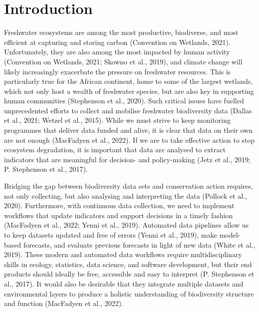 \documentclass[utf8]{frontiersSCNS}
\begin{document}
\hypertarget{introduction}{%
\section*{Introduction}\label{introduction}}

Freshwater ecosystems are among the most productive, biodiverse, and
most efficient at capturing and storing carbon (Convention on Wetlands,
2021). Unfortunately, they are also among the most impacted by human
activity (Convention on Wetlands, 2021; Skowno et al., 2019), and
climate change will likely increasingly exacerbate the pressure on
freshwater resources. This is particularly true for the African
continent, home to some of the largest wetlands, which not only host a
wealth of freshwater species, but are also key in supporting human
communities (Stephenson et al., 2020). Such critical issues have fuelled
unprecedented efforts to collect and mobilise freshwater biodiversity
data (Dallas et al., 2021; Wetzel et al., 2015). While we must strive to
keep monitoring programmes that deliver data funded and alive, it is
clear that data on their own are not enough (MacFadyen et al., 2022). If
we are to take effective action to stop ecosystem degradation, it is
important that data are analysed to extract indicators that are
meaningful for decision- and policy-making (Jetz et al., 2019; P.
Stephenson et al., 2017).

Bridging the gap between biodiversity data sets and conservation action
requires, not only collecting, but also analysing and interpreting the
data (Pollock et al., 2020). Furthermore, with continuous data
collection, we need to implement workflows that update indicators and
support decisions in a timely fashion (MacFadyen et al., 2022; Yenni et
al., 2019). Automated data pipelines allow us to keep datasets updated
and free of errors (Yenni et al., 2019), make model-based forecasts, and
evaluate previous forecasts in light of new data (White et al., 2019).
These modern and automated data workflows require multidisciplinary
skills in ecology, statistics, data science, and software development,
but their end products should ideally be free, accessible and easy to
interpret (P. Stephenson et al., 2017). It would also be desirable that
they integrate multiple datasets and environmental layers to produce a
holistic understanding of biodiversity structure and function (MacFadyen
et al., 2022).
\end{document}
